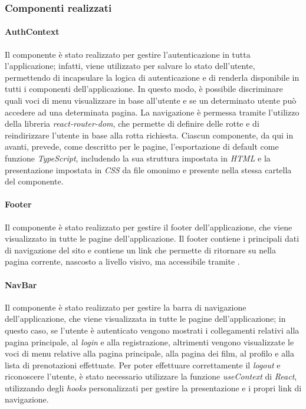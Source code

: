 \newpage

\subsubsection{Componenti realizzati}\label{sec:componenti-realizzati}

\paragraph{AuthContext}\label{par:authcontext}
Il componente è stato realizzato per gestire l'autenticazione in tutta l'applicazione; infatti, viene utilizzato per salvare lo stato dell'utente,
permettendo di incapsulare la logica di autenticazione e di renderla disponibile in tutti i componenti dell'applicazione.
In questo modo, è possibile discriminare quali voci di menu visualizzare in base all'utente e se un determinato utente può accedere ad una determinata pagina.
La navigazione è permessa tramite l'utilizzo della libreria \textit{react-router-dom}, che permette di definire delle rotte e di reindirizzare l'utente in base alla rotta richiesta.
Ciascun componente, da qui in avanti, prevede, come descritto per le pagine, l'esportazione di default come funzione \textit{TypeScript}, includendo la sua struttura impostata in \textit{HTML} e la presentazione impostata in \textit{CSS} da file omonimo
e presente nella stessa cartella del componente.

\paragraph{Footer}\label{par:footer}

Il componente è stato realizzato per gestire il footer dell'applicazione, che viene visualizzato in tutte le pagine dell'applicazione.
Il footer contiene i principali dati di navigazione del sito e contiene un link che permette di ritornare su nella pagina corrente, nascosto a livello visivo, ma accessibile tramite .

\paragraph{NavBar}\label{par:navbar}

Il componente è stato realizzato per gestire la barra di navigazione dell'applicazione, che viene visualizzata in tutte le pagine dell'applicazione; in questo caso, se l'utente è autenticato vengono
mostrati i collegamenti relativi alla pagina principale, al \textit{login} e alla registrazione, altrimenti vengono visualizzate le voci di menu relative alla pagina principale, alla pagina dei film, al profilo e alla lista di prenotazioni effettuate.
Per poter effettuare correttamente il \textit{logout} e riconoscere l'utente, è stato necessario utilizzare la funzione \textit{useContext} di \textit{React}, utilizzando degli \textit{hooks} personalizzati per
gestire la presentazione e i propri link di navigazione.

